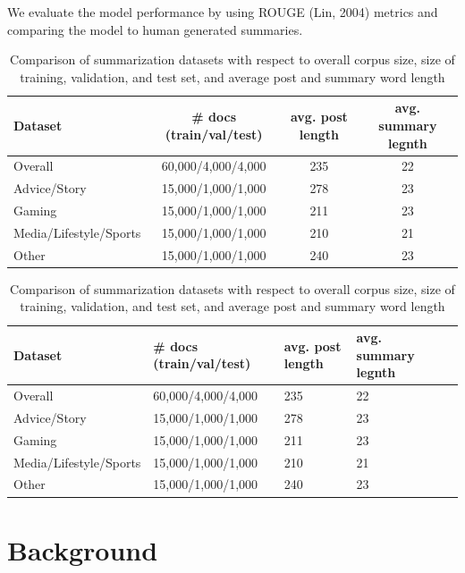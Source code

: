 \documentclass[11pt,a4paper, twocolumn]{article}
\begin{document}
We evaluate the model performance by using ROUGE (Lin, 2004) metrics and comparing the model to human generated summaries.

\begin{table}
\centering
\begin{tabular}{lccc}
\hline \textbf{Dataset} & \textbf{# docs (train/val/test)} & \textbf{avg. post length} & \textbf{avg. summary legnth} \\ \hline
Overall & 60,000/4,000/4,000  & 235 & 22 \\
Advice/Story & 15,000/1,000/1,000 & 278 & 23 \\
Gaming & 15,000/1,000/1,000 & 211 & 23 \\
Media/Lifestyle/Sports & 15,000/1,000/1,000 & 210 & 21 \\
Other & 15,000/1,000/1,000 & 240 & 23 \\
\hline
\end{tabular}
\caption{\label{font-table} Comparison of summarization datasets with respect to overall corpus size, size of training, validation, and
test set, and average post and summary word length}
\end{table}

\begin{table}
\centering
\begin{tabu} to \textwidth {lX[l]X[c]X[c]X[c]}
\hline \textbf{Dataset} & \textbf{# docs (train/val/test)} & \textbf{avg. post length} & \textbf{avg. summary legnth} \\ \hline
Overall & 60,000/4,000/4,000  & 235 & 22 \\
Advice/Story & 15,000/1,000/1,000 & 278 & 23 \\
Gaming & 15,000/1,000/1,000 & 211 & 23 \\
Media/Lifestyle/Sports & 15,000/1,000/1,000 & 210 & 21 \\
Other & 15,000/1,000/1,000 & 240 & 23 \\
\hline
\end{tabu}
\caption{\label{font-table} Comparison of summarization datasets with respect to overall corpus size, size of training, validation, and
test set, and average post and summary word length}
\end{table}


\section{Background}
\label{sec:length}
\end{document}
